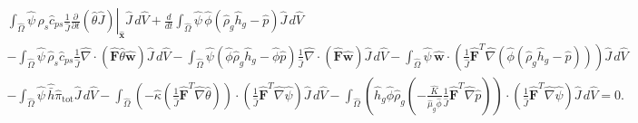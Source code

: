 \documentclass[11pt]{article}
\begin{document}
\begin{multline}
\int_{\widehat{\Omega}}
\widehat{\psi}\,\widehat{\rho}_{s} \widehat{c}_{ps} \frac{1}{\widehat{J}} \left. \frac{\partial}{\partial t} \left( \widehat{\theta} \widehat{J} \right)\right|_{\widehat{\mathbf{x}}} \widehat{J}\,d\widehat{V}
+ \frac{d}{dt} \int_{\widehat{\Omega}}
\widehat{\psi}\,\widehat{\phi}(\widehat{\rho}_g \widehat{h}_g - \widehat{p}) \widehat{J}\,d\widehat{V}
\\
- \int_{\widehat{\Omega}}
\widehat{\psi}\,\widehat{\rho}_{s} \widehat{c}_{ps}
\frac{1}{\widehat{J}} \widehat{\nabla} \cdot \left( \widehat{\mathbf{F}} \widehat{\theta} \widehat{\mathbf{w}} \right)
\widehat{J}\,d\widehat{V}
- \int_{\widehat{\Omega}} \widehat{\psi} \left( \widehat{\phi} \widehat{\rho}_g \widehat{h}_g - \widehat{\phi} \widehat{p} \right)
\frac{1}{\widehat{J}} \widehat{\nabla} \cdot \left( \widehat{\mathbf{F}} \widehat{\mathbf{w}} \right)
\widehat{J}\,d\widehat{V}
- \int_{\widehat{\Omega}}
\widehat{\psi}\,\widehat{\mathbf{w}} \cdot
\left(
\frac{1}{\widehat{J}} \widehat{\mathbf{F}}^{T} \widehat{\nabla}\left( \widehat{\phi}(\widehat{\rho}_g \widehat{h}_g - \widehat{p}) \right)
\right) \widehat{J}\,d\widehat{V}
\\
- \int_{\widehat{\Omega}}
\widehat{\psi}\,\widehat{\bar{h}} \widehat{\pi}_{\mathrm{tot}}\widehat{J}\,d\widehat{V}
- \int_{\widehat{\Omega}}
\left(
 -\widehat{\kappa}
 \left(
 \frac{1}{\widehat{J}} \widehat{\mathbf{F}}^{T} \widehat{\nabla}\widehat{\theta}
 \right)
 \right) \cdot
\left(
\frac{1}{\widehat{J}} \widehat{\mathbf{F}}^{T} \widehat{\nabla}\widehat{\psi}
\right) \widehat{J}\,d\widehat{V}
- \int_{\widehat{\Omega}}
\left(
\widehat{h}_g \widehat{\phi} \widehat{\rho}_g
\left(
-\frac{\widehat{K}}{\widehat{\mu}_g \widehat{\phi}} \frac{1}{\widehat{J}} \widehat{\mathbf{F}}^{T} \widehat{\nabla} \widehat{p}
\right)
\right) \cdot
\left(
\frac{1}{\widehat{J}} \widehat{\mathbf{F}}^{T} \widehat{\nabla}\widehat{\psi}
\right) \widehat{J}\,d\widehat{V}
= 0.
\end{multline}
\end{document}
